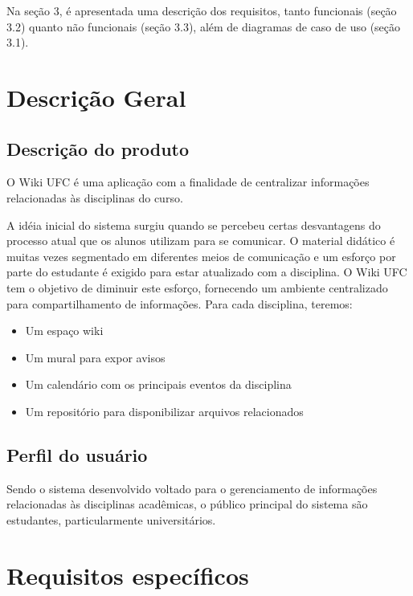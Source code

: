 \documentclass[11pt]{article}
\begin{document}
Na seção 3, é apresentada uma descrição dos requisitos, tanto funcionais (seção 3.2) quanto não funcionais (seção 3.3), além de diagramas de caso de uso (seção 3.1).

\section{Descrição Geral}
\subsection{Descrição do produto}

O Wiki UFC é uma aplicação com a finalidade de centralizar informações relacionadas às disciplinas do curso.

A idéia inicial do sistema surgiu quando se percebeu certas desvantagens do processo atual que os alunos utilizam para se comunicar. O material didático é muitas vezes segmentado em diferentes meios de comunicação e um esforço por parte do estudante é exigido para estar atualizado com a disciplina. O Wiki UFC tem o objetivo de diminuir este esforço, fornecendo um ambiente centralizado para compartilhamento de informações. Para cada disciplina, teremos:

\begin{itemize}
    \item Um espaço wiki
    \item Um mural para expor avisos
    \item Um calendário com os principais eventos da disciplina
    \item Um repositório para disponibilizar arquivos relacionados
\end{itemize}

\subsection{Perfil do usuário}

Sendo o sistema desenvolvido voltado para o gerenciamento de informações relacionadas às disciplinas acadêmicas, o público principal do sistema são estudantes, particularmente universitários.

\section{Requisitos específicos}
\end{document}
